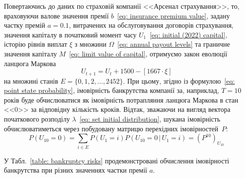 \documentclass{mathreport}
\begin{document}
Повертаючись до даних по страховій компанії <<Арсенал страхування>>, то, враховуючи валове значення премії $b$~\eqref{eq: insurance premium value}, задану частку премій $a=0.1$, витрачених на обслуговування договорів страхування, значення капіталу в початковий момент часу $U_1$~\eqref{eq: initial (2022) capital}, історію рівнів виплат $\xi$ з множини $\Omega$~\eqref{eq: annual payout levels} та граничне значення капіталу $M$~\eqref{eq: limit value of capital}, отримуємо закон еволюції ланцюга Маркова
\begin{equation}\label{eq: real capital evolution}
    U_{t+1} = U_{t} + 1500 - [1667 \cdot \xi]
\end{equation}
на множині станів $E=\{ 0,1,2,\ldots,2452 \}$. При цьому, згідно із формулою~\eqref{eq: point state probability}, імовірність банкрутства компанії за, наприклад, $T=10$ років буде обчислюватися як імовірність потрапляння ланцюга Маркова в стан <<0>> за відповідну кількість кроків. Відтак, зважаючи на вигляд вектора початкового розподілу $\lambda$~\eqref{eq: set initial distribution}, шукана імовірність обчислюватиметься через побудовану матрицю перехідних імовірностей~$P:$
\begin{equation}\label{eq: real point state probability}
    P\left( U_{10}=0 \right) = \sum\limits_{i \in E} P\left( U_1=i \right) P\left( U_{10}=0 \,|\, U_1=i \right) = \left( P^{10} \right)_{U_10}
\end{equation}

У Табл.~\ref{table: bankruptcy risks} продемонстровані обчислення імовірності банкрутства при різних значеннях частки премії $a$.
\end{document}
